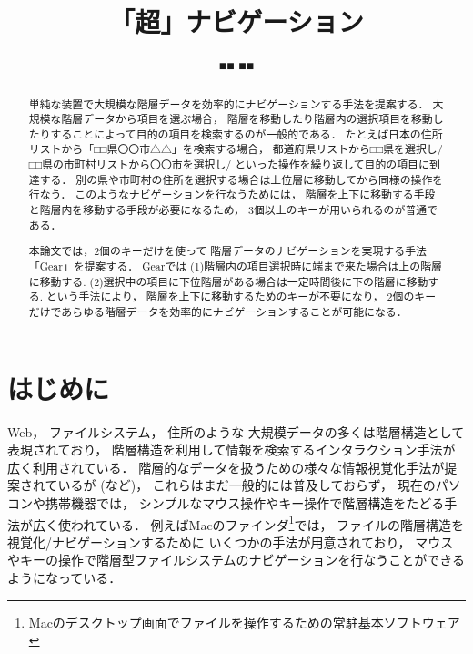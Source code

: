 \documentclass[twoside]{wiss}
\def\GEAR{\textsf{Gear}}
\begin{document}
\title{「超」ナビゲーション}
\etitle{} %

\author{■■ ■■}

\begin{abstract}
単純な装置で大規模な階層データを効率的にナビゲーションする手法を提案する．
%
大規模な階層データから項目を選ぶ場合，
階層を移動したり階層内の選択項目を移動したりすることによって目的の項目を検索するのが一般的である．
たとえば日本の住所リストから「□□県〇〇市△△」を検索する場合，
都道府県リストから□□県を選択し/□□県の市町村リストから〇〇市を選択し/
といった操作を繰り返して目的の項目に到達する．
別の県や市町村の住所を選択する場合は上位層に移動してから同様の操作を行なう．
%
このようなナビゲーションを行なうためには，
階層を上下に移動する手段と階層内を移動する手段が必要になるため，
3個以上のキーが用いられるのが普通である．

本論文では，2個のキーだけを使って
階層データのナビゲーションを実現する手法「{\GEAR}」を提案する．
{\GEAR}では
(1)階層内の項目選択時に端まで来た場合は上の階層に移動する.
(2)選択中の項目に下位階層がある場合は一定時間後に下の階層に移動する.
という手法により，
階層を上下に移動するためのキーが不要になり，
2個のキーだけであらゆる階層データを効率的にナビゲーションすることが可能になる．
\end{abstract}

\maketitle

\section{はじめに}

Web，
ファイルシステム，
住所のような
大規模データの多くは階層構造として表現されており，
階層構造を利用して情報を検索するインタラクション手法が広く利用されている．
階層的なデータを扱うための様々な情報視覚化手法が提案されているが
(\cite{Johnson:1991:TSA:949607.949654}\cite{Lamping:1995:FTB:223904.223956}\cite{Perlin:1993:PAA:166117.166125}\cite{Stasko:2000:FDN:857190.857683}など)，
これらはまだ一般的には普及しておらず，
現在のパソコンや携帯機器では，
シンプルなマウス操作やキー操作で階層構造をたどる手法が広く使われている．
%
例えばMacのファインダ\footnote{
  Macのデスクトップ画面でファイルを操作するための常駐基本ソフトウェア
}では，
ファイルの階層構造を視覚化/ナビゲーションするために
いくつかの手法が用意されており，
マウスやキーの操作で階層型ファイルシステムのナビゲーションを行なうことができるようになっている．
\end{document}
